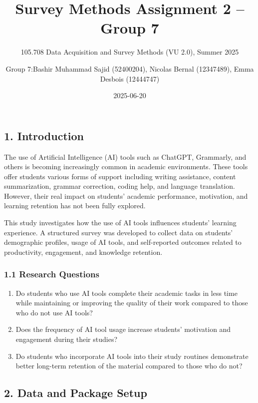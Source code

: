 \documentclass[
]{article}
\title{Survey Methods Assignment 2 -- Group 7}
\subtitle{105.708 Data Acquisition and Survey Methods (VU 2.0), Summer
2025}
\author{Group 7:Bashir Muhammad Sajid (52400204), Nicolas Bernal
(12347489), Emma Desbois (12444747)}
\date{2025-06-20}
\begin{document}
\maketitle

{
\setcounter{tocdepth}{3}
\tableofcontents
}
\subsection{1. Introduction}\label{introduction}

The use of Artificial Intelligence (AI) tools such as ChatGPT,
Grammarly, and others is becoming increasingly common in academic
environments. These tools offer students various forms of support
including writing assistance, content summarization, grammar correction,
coding help, and language translation. However, their real impact on
students' academic performance, motivation, and learning retention has
not been fully explored.

This study investigates how the use of AI tools influences students'
learning experience. A structured survey was developed to collect data
on students' demographic profiles, usage of AI tools, and self-reported
outcomes related to productivity, engagement, and knowledge retention.

\subsubsection{1.1 Research Questions}\label{research-questions}

\begin{enumerate}
\def\labelenumi{\arabic{enumi}.}
\item
  Do students who use AI tools complete their academic tasks in less
  time while maintaining or improving the quality of their work compared
  to those who do not use AI tools?
\item
  Does the frequency of AI tool usage increase students' motivation and
  engagement during their studies?
\item
  Do students who incorporate AI tools into their study routines
  demonstrate better long-term retention of the material compared to
  those who do not?
\end{enumerate}

\subsection{2. Data and Package Setup}\label{data-and-package-setup}
\end{document}
